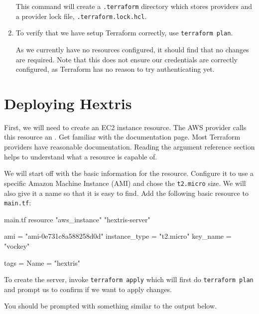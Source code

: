 \documentclass{csse4400}
\begin{document}
\begin{enumerate}
This command will create a \texttt{.terraform} directory which stores providers and a provider lock file, \texttt{.terraform.lock.hcl}.

\item To verify that we have setup Terraform correctly, use \texttt{terraform plan}.

As we currently have no resources configured, it should find that no changes are required.
Note that this does not ensure our credentials are correctly configured, as Terraform has no reason to try authenticating yet.

\end{enumerate}

\section{Deploying Hextris}
First, we will need to create an EC2 instance resource.
The AWS provider calls this resource an .
Get familiar with the documentation page.
Most Terraform providers have reasonable documentation.
Reading the argument reference section helps to understand what a resource is capable of.

We will start off with the basic information for the resource.
Configure it to use a specific Amazon Machine Instance (AMI) and chose the \texttt{t2.micro} size.
We will also give it a name so that it is easy to find.
Add the following basic resource to \texttt{main.tf}:

\begin{code}[language=terraform,numbers=none]{main.tf}
resource "aws_instance" "hextris-server" {
    ami           = "ami-0e731c8a588258d0d"
    instance_type = "t2.micro"
    key_name      = "vockey"
    
    tags = {
        Name = "hextris"
    }
}      
\end{code}

To create the server, invoke
\texttt{terraform apply} which will first do \texttt{terraform plan} and prompt us to confirm if we want to apply changes.


You should be prompted with something similar to the output below.
\end{document}
